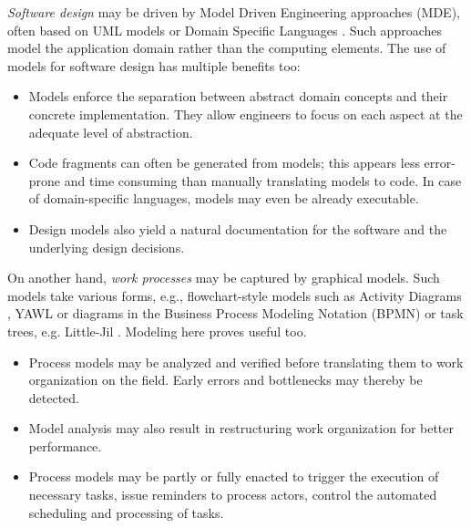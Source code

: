 \emph{Software design} may be driven by Model Driven Engineering approaches (MDE), often based on UML models \cite{OMG:2004} or Domain Specific Languages \cite{VanDeursen:2000, Fowler:2010}. Such approaches model the application domain rather than the computing elements. The use of models for software design has multiple benefits too:
\begin{itemize}
\item Models enforce the separation between abstract domain concepts and their concrete implementation. They allow engineers to focus on each aspect at the adequate level of abstraction.
\item Code fragments can often be generated from models; this appears less error-prone and time consuming than manually translating models to code. In case of domain-specific languages, models may even be already executable. 
\item Design models also yield a natural documentation for the software and the underlying design decisions. 
\end{itemize}


On another hand, \emph{work processes} may be captured by graphical models. Such models take various forms, e.g., flowchart-style models such as Activity Diagrams \cite{OMG:2004}, YAWL \cite{Vanderaalst:2005} or diagrams in the Business Process Modeling Notation (BPMN) \cite{OMG:2008} or task trees, e.g. Little-Jil \cite{Clarke:2008}. Modeling here proves useful too.
\begin{itemize}
\item Process models may be analyzed and verified before translating them to work organization on the field. Early errors and bottlenecks may thereby be detected.
\item Model analysis may also result in restructuring work organization for better performance.
\item Process models may be partly or fully enacted to trigger the execution of necessary tasks, issue reminders to process actors, control the automated scheduling and processing of tasks.
\end{itemize}
